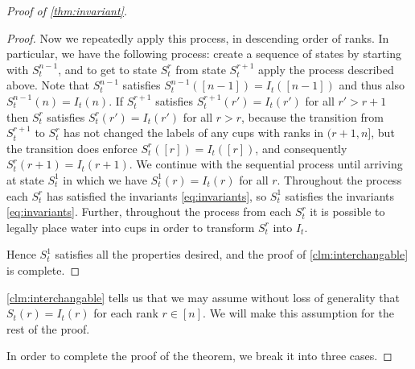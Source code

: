 \begin{proof}[Proof of \cref{thm:invariant}]
\begin{proof}
Now we repeatedly apply this process, in descending order of ranks. 
In particular, we have the following process: create a sequence of states by
starting with $S_t^{n-1}$, and to get to state $S_t^{r}$ from state $S_t^{r+1}$
apply the process described above. 
Note that $S_t^{n-1}$ satisfies $S_t^{n-1}([n-1]) = I_t([n-1])$ and thus also
$S_t^{n-1}(n) = I_t(n)$.
If $S_t^{r+1}$ satisfies $S_t^{r+1}(r') = I_t(r')$ for all $r'>r+1$ then
$S_t^r$ satisfies $S_t^r(r') = I_t(r')$ for all $r > r$, because the transition
from $S_t^{r+1}$ to $S_t^r$ has not changed the labels of any cups with ranks
in $(r+1, n]$, but the transition does enforce $S_t^r([r]) = I_t([r])$, and
consequently $S_t^r(r+1) = I_t(r+1)$.
We continue with the sequential process until arriving at state $S_t^1$ in
which we have $S_t^1(r) = I_t(r)$ for all $r$.
Throughout the process each $S_t^r$ has satisfied the invariants
\eqref{eq:invariants}, so $S_t^1$ satisfies the invariants
\eqref{eq:invariants}. Further, throughout the process from each $S_t^r$ it is
possible to legally place water into cups in order to transform $S_t^r$ into
$I_t$.

Hence $S_t^1$ satisfies all the properties desired, and the proof of 
\cref{clm:interchangable} is complete.

\end{proof}

\cref{clm:interchangable} tells us that we may assume without loss of
generality that $S_t(r) = I_t(r)$ for each rank $r \in [n]$. We will make
this assumption for the rest of the proof. 

In order to complete the proof of the theorem, we break it into three cases. 


\end{proof}
